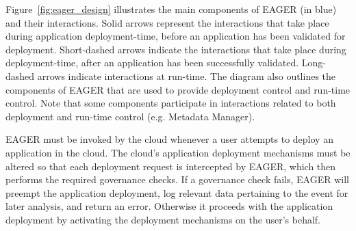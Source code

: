 
Figure~\ref{fig:eager_design} illustrates the main components of EAGER (in
blue) and their interactions. Solid arrows represent the interactions that take place
during application deployment-time, before an application has been validated
for deployment. Short-dashed arrows indicate the interactions that take place
during deployment-time, after an application has been successfully validated.
Long-dashed arrows indicate interactions at run-time. The diagram also outlines the
components of EAGER that are used to provide deployment  control and run-time control.
Note that some components participate in interactions related to both deployment and
run-time control (e.g. Metadata Manager).

EAGER must be invoked by the cloud whenever a user
attempts to deploy an application in the cloud.
The cloud's application deployment mechanisms must be altered so that
each deployment request is
intercepted by EAGER, which then performs the required governance checks.
If a governance check fails, EAGER will preempt the application deployment,
log relevant data pertaining to the event for later analysis,  and
return an error. Otherwise it proceeds with the application deployment by
activating the deployment mechanisms on the user's 
behalf. 

